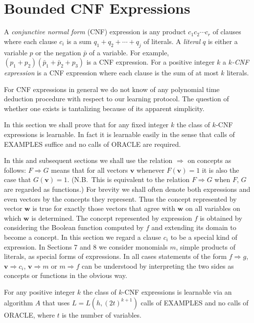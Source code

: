 \section{Bounded CNF Expressions}

A \emph{conjunctive normal form} (CNF) expression is any product
$c_1 c_2 \cdots c_r$ of clauses where each clause $c_i$ is a sum
$q_1 + q_2 + \cdots + q_j$ of literals. A \emph{literal} $q$ is
either a variable $p$ or the negation $\bar{p}$ of a variable. For
example, $(p_1 + p_2)(\bar{p}_1 + \bar{p}_2 + p_3)$ is a CNF
expression. For a positive integer $k$ a \emph{$k$-CNF expression} is
a CNF expression where each clause is the sum of at most $k$
literals.

For CNF expressions in general we do not know of any polynomial time
deduction procedure with respect to our learning protocol. The
question of whether one exists is tantalizing because of its apparent
simplicity.

In this section we shall prove that for any fixed integer $k$ the
class of $k$-CNF expressions is learnable. In fact it is learnable
easily in the sense that calls of EXAMPLES suffice and no calls of
ORACLE are required.

In this and subsequent sections we shall use the relation $\Rightarrow$
on concepts as follows: $F \Rightarrow G$ means that for all vectors
$\mathbf{v}$ whenever $F(\mathbf{v}) = 1$ it is also the case that
$G(\mathbf{v}) = 1$. (N.B.\ This is equivalent to the relation
$F \Rightarrow G$ when $F$, $G$ are regarded as functions.) For
brevity we shall often denote both expressions and even vectors by
the concepts they represent. Thus the concept represented by vector
$\mathbf{w}$ is true for exactly those vectors that agree with
$\mathbf{w}$ on all variables on which $\mathbf{w}$ is determined.
The concept represented by expression $f$ is obtained by considering
the Boolean function computed by $f$ and extending its domain to
become a concept. In this section we regard a clause $c_i$ to be a
special kind of expression. In Sections 7 and 8 we consider monomials
$m$, simple products of literals, as special forms of expressions. In
all cases statements of the form $f \Rightarrow g$,
$\mathbf{v} \Rightarrow c_i$, $\mathbf{v} \Rightarrow m$ or
$m \Rightarrow f$ can be understood by interpreting the two sides as
concepts or functions in the obvious way.

\begin{theorem}[Theorem A]
For any positive integer $k$ the class of $k$-CNF expressions is
learnable via an algorithm $A$ that uses
$L = L(h, (2t)^{k+1})$ calls of \textup{EXAMPLES} and no calls of
\textup{ORACLE}, where $t$ is the number of variables.
\end{theorem}

